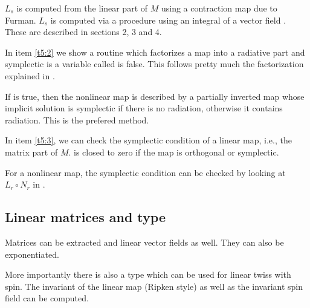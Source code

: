 \documentclass{hitec}     %
\begin{document}
{{{$L_s$ is computed from the linear part of $M$ using a contraction map due to Furman. $L_s$ is computed via a procedure using an  integral of a vector field . These are    described in \cite{forestreview} sections 2, 3 and 4.

In item \ref{t5:2} we show a routine which factorizes a map into a radiative part and symplectic is a variable called  is false. This follows pretty much the factorization explained in .

If  is true, then the nonlinear map is described by a partially inverted map whose implicit solution is symplectic if there is no radiation, otherwise it contains radiation. This is the prefered method.

In item \ref{t5:3}, we can check the symplectic condition of a linear map, i.e., the matrix part of $M$. 
 is closed to zero if the map is orthogonal or symplectic.

For a nonlinear map, the symplectic condition can be checked by looking at ${L}_{r}\circ {N}_{r}$ in .


\subsection{Linear matrices and type   }
\label{s:linstuff}

Matrices can be extracted  and linear vector fields as well.  They can also be exponentiated.

More importantly there is also a type  which can be used for linear twiss with spin. The invariant of the linear map (Ripken style) as well as the invariant spin field can be computed.


}}}
\end{document}
